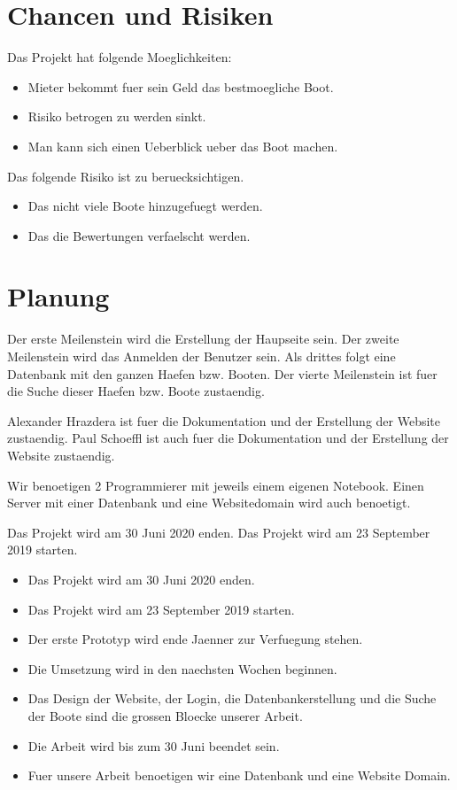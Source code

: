 \documentclass[12pt]{article}
\theoremstyle{definition}
\newenvironment{explanation}{%
   \setlength{\parindent}{0pt}
   \itshape
   \color{blue}
}{}
\begin{document}
\pagebreak
\section{Chancen und Risiken}
\begin{explanation}
Das Projekt hat folgende Moeglichkeiten:
\begin{itemize}
\item Mieter bekommt fuer sein Geld das bestmoegliche Boot.
\item Risiko betrogen zu werden sinkt.
\item Man kann sich einen Ueberblick ueber das Boot machen.
\end{itemize}

Das folgende Risiko ist zu beruecksichtigen.
\begin{itemize}
\item Das nicht viele Boote hinzugefuegt werden.
\item Das die Bewertungen verfaelscht werden.
\end{itemize}

\end{explanation}

\pagebreak
\section{Planung}
\begin{explanation}
Der erste Meilenstein wird die Erstellung der Haupseite sein.
Der zweite Meilenstein wird das Anmelden der Benutzer sein.
Als drittes folgt eine Datenbank mit den ganzen Haefen bzw. Booten.
Der vierte Meilenstein ist fuer die Suche dieser Haefen bzw. Boote zustaendig.

Alexander Hrazdera ist fuer die Dokumentation und der Erstellung der Website zustaendig.
Paul Schoeffl ist auch fuer die Dokumentation und der Erstellung der Website zustaendig. 

Wir benoetigen 2 Programmierer mit jeweils einem eigenen Notebook. Einen Server mit einer Datenbank und eine Websitedomain wird auch benoetigt.

Das Projekt wird am 30 Juni 2020 enden.
Das Projekt wird am 23 September 2019 starten. 
\begin{itemize}
\item Das Projekt wird am 30 Juni 2020 enden.
\item Das Projekt wird am 23 September 2019 starten.
\item Der erste Prototyp wird ende Jaenner zur Verfuegung stehen.
\item Die Umsetzung wird in den naechsten Wochen beginnen.
\item Das Design der Website, der Login, die Datenbankerstellung und die Suche der Boote sind die grossen Bloecke unserer Arbeit.
\item Die Arbeit wird bis zum 30 Juni beendet sein.
\item Fuer unsere Arbeit benoetigen wir eine Datenbank und eine Website Domain.
\end{itemize}
\end{explanation}
\end{document}
